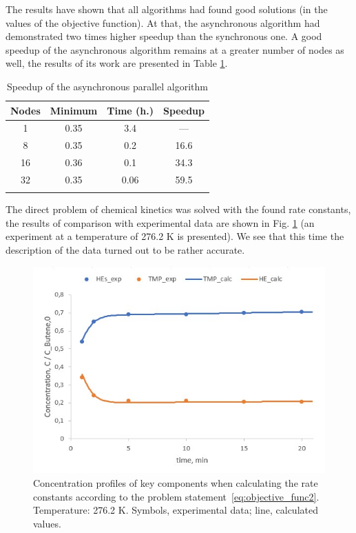 \documentclass{svproc}
\begin{document}
The results have shown that all algorithms had found good solutions (in the values of the objective function). At that, the asynchronous algorithm had demonstrated two times higher speedup than the synchronous one. A good speedup of the asynchronous algorithm remains at a greater number of nodes as well, the results of its work are presented in Table \ref{tab_parall}.

\begin{table}
\caption{Speedup of the asynchronous parallel algorithm}
\label{tab_parall}
\begin{center}
\begin{tabular}{cccc}
\hline\noalign{\smallskip}
Nodes  & Minimum  & Time (h.) & Speedup \\
\hline\noalign{\smallskip}
1  & 0.35   &   3.4     &   ---        \\
8  & 0.35   &   0.2     &   16.6       \\
16 & 0.36   &   0.1     &   34.3       \\
32 & 0.35   &   0.06    &   59.5       \\
\noalign{\smallskip}\hline
\end{tabular}\end{center}\end{table}

The direct problem of chemical kinetics was solved with the found rate constants, the results of comparison with experimental data are shown in Fig. \ref{fig:res2} (an experiment at a temperature of 276.2 K is presented). We see that this time the description of the data turned out to be rather accurate.

\begin{figure}
\begin{center}
  \includegraphics[width=0.7\linewidth]{res2.jpg}
  \caption{Concentration profiles of key components when calculating the rate constants according to the problem statement~\ref{eq:objective_func2}. Temperature: 276.2 K. Symbols, experimental data; line, calculated values.}
  \label{fig:res2}  
\end{center}
\end{figure}
\end{document}
